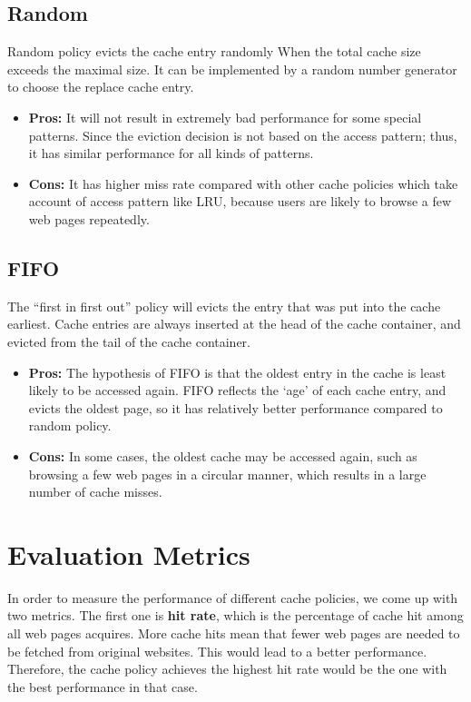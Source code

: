 \documentclass[paper=a4, fontsize=11pt]{scrartcl} %
\numberwithin{equation}{section} %
\numberwithin{figure}{section} %
\numberwithin{table}{section} %
\begin{document}
\subsection{Random}
Random policy evicts the cache entry randomly When the total cache 
size exceeds the maximal size. It can be implemented by a random
number generator to choose the replace cache entry.
\begin{itemize}
\item \textbf{Pros:} It will not result in extremely bad performance
for some special 
 patterns. Since the eviction decision is not based on the 
access pattern; thus, it has similar performance for all kinds of patterns.
\item \textbf{Cons:} It has higher miss rate compared with other cache 
policies which take account of access pattern like LRU, because users
are likely to browse a few web pages repeatedly.
\end{itemize}

\subsection{FIFO}
The ``first in first out'' policy will evicts the entry that was put 
into the cache earliest. Cache entries are always inserted at the head
of the cache container, and evicted from the tail of the cache container.
\begin{itemize}
\item \textbf{Pros:} The hypothesis of FIFO is that the oldest entry in the cache is least
likely to be accessed again. FIFO reflects the `age' of each cache entry, 
and evicts the oldest page, so it has relatively better performance compared
to random policy.
\item \textbf{Cons:} In some cases, the oldest cache may be accessed again,
such as browsing a few web pages in a circular manner, which results in
a large 
number of cache misses. 
\end{itemize}

\section{Evaluation Metrics}

In order to measure the performance of different cache policies, we come up with two metrics. The first one is \textbf{hit rate}, which is the percentage of cache hit among all web pages acquires. 
More cache hits mean that fewer web pages are needed to be fetched from original websites. This would lead to a better performance. Therefore, the cache policy achieves the highest hit rate would be the one with the best performance in that case. 
\end{document}
